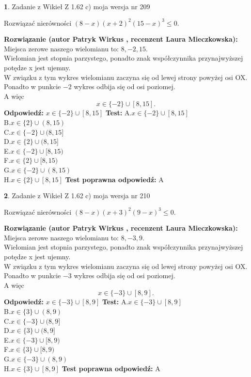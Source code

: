 \documentclass[12pt, a4paper]{article}
\theoremstyle{definition} %
\newtheorem{zad}{}
\newcommand{\zadStart}[1]{\begin{zad}#1\newline}
\newcommand{\zadStop}{\end{zad}}
\newcommand{\rozwStart}[2]{\noindent \textbf{Rozwiązanie (autor #1 , recenzent #2): }\newline}
\newcommand{\rozwStop}{\newline}
\newcommand{\odpStart}{\noindent \textbf{Odpowiedź:}\newline}
\newcommand{\odpStop}{\newline}
\newcommand{\testStart}{\noindent \textbf{Test:}\newline}
\newcommand{\testStop}{\newline}
\newcommand{\kluczStart}{\noindent \textbf{Test poprawna odpowiedź:}\newline}
\newcommand{\kluczStop}{\newline}
\begin{document}
\zadStart{Zadanie z Wikieł Z 1.62 c) moja wersja nr 209}

Rozwiązać nierówności $(8-x)(x+2)^{2}(15-x)^{3}\le0$.
\zadStop
\rozwStart{Patryk Wirkus}{Laura Mieczkowska}
Miejsca zerowe naszego wielomianu to: $8, -2, 15$.\\
Wielomian jest stopnia parzystego, ponadto znak współczynnika przy\linebreak najwyższej potędze x jest ujemny.\\ W związku z tym wykres wielomianu zaczyna się od lewej strony powyżej osi OX.\\
Ponadto w punkcie $-2$ wykres odbija się od osi poziomej.\\
A więc $$x \in \{-2\} \cup [8,15].$$
\rozwStop
\odpStart
$x \in \{-2\} \cup [8,15]$
\odpStop
\testStart
A.$x \in \{-2\} \cup [8,15]$\\
B.$x \in \{2\} \cup (8,15)$\\
C.$x \in \{-2\} \cup (8,15]$\\
D.$x \in \{2\} \cup (8,15]$\\
E.$x \in \{-2\} \cup [8,15)$\\
F.$x \in \{2\} \cup [8,15)$\\
G.$x \in \{-2\} \cup (8,15)$\\
H.$x \in \{2\} \cup [8,15]$
\testStop
\kluczStart
A
\kluczStop



\zadStart{Zadanie z Wikieł Z 1.62 c) moja wersja nr 210}

Rozwiązać nierówności $(8-x)(x+3)^{2}(9-x)^{3}\le0$.
\zadStop
\rozwStart{Patryk Wirkus}{Laura Mieczkowska}
Miejsca zerowe naszego wielomianu to: $8, -3, 9$.\\
Wielomian jest stopnia parzystego, ponadto znak współczynnika przy\linebreak najwyższej potędze x jest ujemny.\\ W związku z tym wykres wielomianu zaczyna się od lewej strony powyżej osi OX.\\
Ponadto w punkcie $-3$ wykres odbija się od osi poziomej.\\
A więc $$x \in \{-3\} \cup [8,9].$$
\rozwStop
\odpStart
$x \in \{-3\} \cup [8,9]$
\odpStop
\testStart
A.$x \in \{-3\} \cup [8,9]$\\
B.$x \in \{3\} \cup (8,9)$\\
C.$x \in \{-3\} \cup (8,9]$\\
D.$x \in \{3\} \cup (8,9]$\\
E.$x \in \{-3\} \cup [8,9)$\\
F.$x \in \{3\} \cup [8,9)$\\
G.$x \in \{-3\} \cup (8,9)$\\
H.$x \in \{3\} \cup [8,9]$
\testStop
\kluczStart
A
\kluczStop
\end{document}
